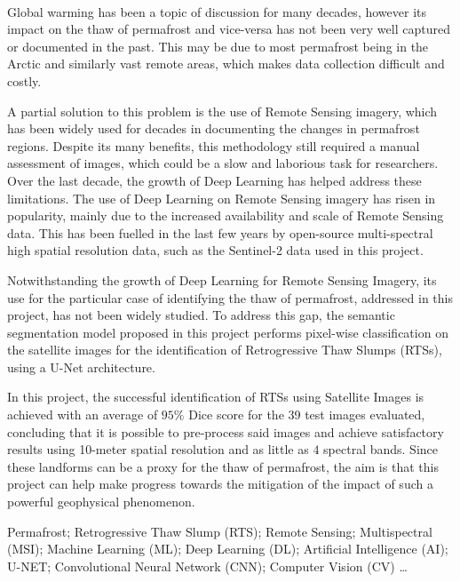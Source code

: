 \paragraph{}
Global warming has been a topic of discussion for many decades, however its impact on the thaw of permafrost and vice-versa has not been very well captured or documented in the past. This may be due to most permafrost being in the Arctic and similarly vast remote areas, which makes data collection difficult and costly.

A partial solution to this problem is the use of Remote Sensing imagery, which has been widely used for decades in documenting the changes in permafrost regions. Despite its many benefits, this methodology still required a manual assessment of images, which could be a slow and laborious task for researchers.
Over the last decade, the growth of Deep Learning has helped address these limitations. The use of Deep Learning on Remote Sensing imagery has risen in popularity, mainly due to the increased availability and scale of Remote Sensing data. This has been fuelled in the last few years by open-source multi-spectral high spatial resolution data, such as the Sentinel-2 data used in this project.

Notwithstanding the growth of Deep Learning for Remote Sensing Imagery, its use for the particular case of identifying the thaw of permafrost, addressed in this project, has not been widely studied. To address this gap, the semantic segmentation model proposed in this project performs pixel-wise classification on the satellite images for the identification of Retrogressive Thaw Slumps (RTSs), using a U-Net architecture.

In this project, the successful identification of RTSs using Satellite Images is achieved with an average of $95\%$ Dice score for the 39 test images evaluated, concluding that it is possible to pre-process said images and achieve satisfactory results using 10-meter spatial resolution and as little as $4$ spectral bands. Since these landforms can be a proxy for the thaw of permafrost, the aim is that this project can help make progress towards the mitigation of the impact of such a powerful geophysical phenomenon.


\begin{keywords}
Permafrost; Retrogressive Thaw Slump (RTS); Remote Sensing; Multispectral (MSI); Machine Learning (ML); Deep Learning (DL); Artificial Intelligence (AI); U-NET; Convolutional Neural Network (CNN); Computer Vision (CV) \ldots
\end{keywords} 
